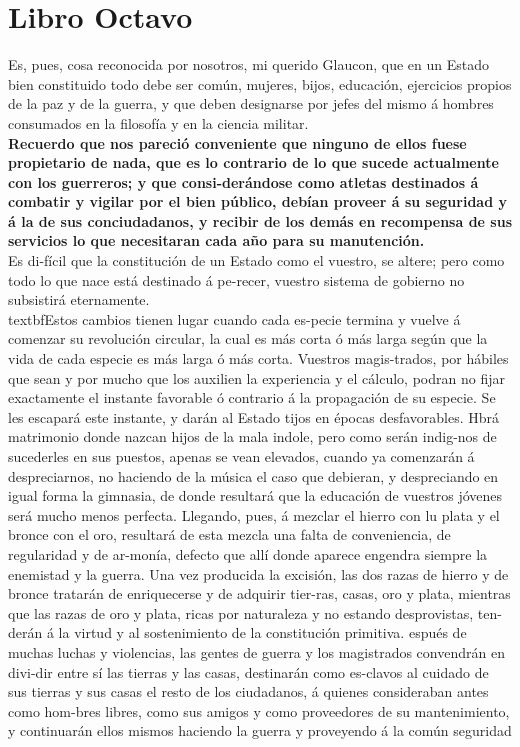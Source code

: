 \documentclass[10pt]{book}
\begin{document}
\chapter*{Libro Octavo}
Es,  pues,  cosa  reconocida  por  nosotros,  mi  querido  Glaucon,  que en un Estado  bien constituido  todo debe ser común,  mujeres,  bijos,  educación,   ejercicios  propios  de  la  paz  y  de la guerra,  y  que  deben  designarse  por jefes del  mismo  á  hombres  consumados  en  la filosofía y  en  la  ciencia  militar. \\
\textbf{Recuerdo que nos  pareció  conveniente  que  ninguno  de  ellos fuese  propietario  de nada,  que  es lo contrario  de  lo que  sucede actualmente  con los guerreros;  y que consi-derándose  como atletas destinados á combatir y vigilar por el bien público,  debían  proveer  á su  seguridad  y á la  de  sus conciudadanos,  y  recibir  de los  demás  en  recompensa  de  sus  servicios  lo  que  necesitaran  cada  año  para   su   manutención.}\\
Es  di-fícil que  la  constitución  de  un  Estado  como  el  vuestro,  se  altere;  pero  como  todo   lo  que  nace  está  destinado  á pe-recer,  vuestro  sistema  de  gobierno  no  subsistirá   eternamente. \\textbf{Estos  cambios  tienen  lugar   cuando  cada es-pecie termina y  vuelve  á  comenzar su revolución  circular,  la  cual  es  más  corta  ó  más  larga  según  que la  vida  de  cada  especie  es más larga  ó  más corta.  Vuestros  magis-trados,  por hábiles  que sean y por mucho  que los  auxilien  la  experiencia  y  el  cálculo,  podran  no  fijar  exactamente  el instante  favorable  ó contrario   á  la  propagación  de  su  especie.  Se les escapará  este  instante,  y  darán  al  Estado  tijos  en épocas  desfavorables. Hbrá matrimonio donde nazcan hijos de la mala indole, pero  como  serán  indig-nos  de sucederles  en sus puestos, apenas se vean  elevados,  cuando ya  comenzarán  á  despreciarnos,  no   haciendo  de  la  música  el caso  que  debieran,  y  despreciando  en  igual  forma  la  gimnasia,  de donde resultará  que  la educación de vuestros jóvenes será mucho menos perfecta. Llegando,  pues,  á  mezclar  el  hierro  con lu  plata   y  el  bronce  con  el  oro,  resultará   de  esta  mezcla  una  falta  de conveniencia,  de regularidad y  de  ar-monía,  defecto  que  allí  donde  aparece  engendra  siempre  la  enemistad  y la  guerra. Una vez producida la excisión, las dos razas de hierro y  de bronce tratarán  de  enriquecerse  y   de  adquirir  tier-ras,  casas,  oro  y plata,  mientras  que  las  razas   de  oro y plata,  ricas por  naturaleza y no estando desprovistas, ten-derán  á  la  virtud  y  al  sostenimiento  de  la   constitución   primitiva. espués  de  muchas  luchas  y   violencias,   las   gentes  de guerra  y  los magistrados  convendrán  en  divi-dir  entre  sí las tierras  y  las  casas,  destinarán   como  es-clavos  al  cuidado  de  sus tierras  y  sus  casas  el  resto  de  los ciudadanos,  á  quienes  consideraban  antes  como  hom-bres libres,  como sus  amigos  y  como  proveedores  de su mantenimiento,  y  continuarán   ellos  mismos haciendo  la  guerra  y  proveyendo  á la  común  seguridad}\\
\end{document}
